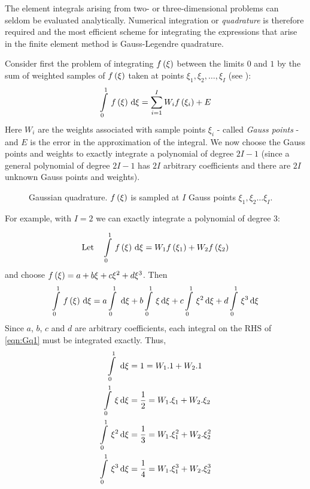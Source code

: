  The element integrals arising from two- or
three-dimensional problems can seldom be evaluated analytically. Numerical
integration or \emph{quadrature} is therefore required and the most efficient
scheme for integrating the expressions that arise in the finite element method
is Gauss-Legendre quadrature.

Consider first the problem of integrating $ f\left( \xi \right) $ between the limits
$0$ and $1$ by the sum of weighted samples of $ f\left( \xi \right) $ taken at points
$\xi_{1},\xi_{2},\ldots,\xi_{I}$ (see ):
\begin{equation*}
  \gint{0}{1}{\fnof{f}{\xi}}{\xi} = \dsuml{i=1}{I}W_{i}\fnof{f}{\xi_{i}} + E
\end{equation*}
Here $W_{i}$ are the weights associated with sample points $\xi_{i}$ -
called \emph{Gauss points} - and $E$ is the error in the approximation of the
integral. We now choose the Gauss points and weights to exactly integrate a
polynomial of degree $2I-1$ (since a general polynomial of degree $2I-1$ has
$2I$ arbitrary coefficients and there are $2I$ unknown Gauss points and
weights).
\begin{figure} \centering
  
  \caption{Gaussian quadrature. $ f\left( \xi \right) $ is sampled at $I$ Gauss points 
  $\xi_{1},\xi_{2} \ldots \xi_{I}.$}
  \label{fig:Gaussian_quadrature}
\end{figure}

For example, with $I=2$ we can exactly integrate a polynomial of degree 3:

\begin{equation*}
  \text{Let}\quad\gint{0}{1}{\fnof{f}{\xi}}{\xi}=W_{1}\fnof{f}{\xione}+
  W_{2}\fnof{f}{\xitwo} 
\end{equation*}
and choose $ f\left( \xi \right)  = a + b\xi + c\xi^{2} + d\xi^{3}$. Then 
\begin{equation}
  \gint{0}{1}{\fnof{f}{\xi}}{\xi} = a\gint{0}{1}{}{\xi} + 
  b\gint{0}{1}{\xi}{\xi} + c\gint{0}{1}{\xi^{2}}{\xi} + 
  d\gint{0}{1}{\xi^{3}}{\xi} 
  \label{eqn:Gq1}
\end{equation}
Since $a$, $b$, $c$ and $d$ are arbitrary coefficients, each integral on the RHS of 
\ref{eqn:Gq1} must be integrated exactly. Thus,
\begin{align}
\gint{0}{1}{}{\xi} &= 1 = W_{1}.1 + W_{2}.1 \label{eqn:Gq2} \\
\gint{0}{1}{\xi}{\xi} &= \dfrac12 = W_{1}.\xi_{1} + W_{2}.\xi_{2} \label{eqn:Gq3}\\
\gint{0}{1}{\xi^{2}}{\xi} &= \dfrac13 = W_{1}.\xi_{1}^{2} + W_{2}.\xi_{2}^{2} \label{eqn:Gq4}\\
\gint{0}{1}{\xi^{3}}{\xi} &= \dfrac14 = W_{1}.\xi_{1}^{3} + W_{2}.\xi_{2}^{3} \label{eqn:Gq5}
\end{align}


